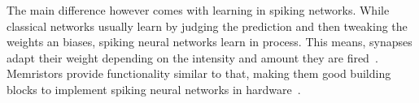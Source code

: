 \documentclass[conference]{IEEEtran}
\begin{document}
    The main difference however comes with learning in spiking networks.
    While classical networks usually learn by judging the prediction and then tweaking the weights an biases, spiking neural networks learn in process.
    This means, synapses adapt their weight depending on the intensity and amount they are fired~\cite{carrillo2012scalable}.
    Memristors provide functionality similar to that, making them good building blocks to implement spiking neural networks in hardware~\cite{querlioz2011simulation}.

    \medskip

    
    
\end{document}

